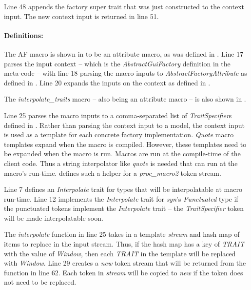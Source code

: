 Line 48 appends the factory super trait that was just constructed to the context input.
The new context input is returned in line 51.

\paragraph{Definitions:}
The AF macro is shown in  to be an attribute macro, as was defined in .
Line 17 parses the input context -- which is the \textit{AbstractGuiFactory} definition in the meta-code -- with line 18 parsing the macro inputs to \textit{AbstractFactoryAttribute} as defined in .
Line 20 expands the inputs on the context as defined in .

The \textit{interpolate\_traits} macro -- also being an attribute macro -- is also shown in .

Line 25 parses the macro inputs to a comma-separated list of \textit{TraitSpecifier}s defined in .
Rather than parsing the context input to a model, the context input is used as a template for each concrete factory implementation.
\textit{Quote} macro templates expand when the macro is compiled.
However, these templates need to be expanded when the macro is run.
Macros are run at the compile-time of the client code.
Thus a string interpolator like \textit{quote} is needed that can run at the macro's run-time.
 defines such a helper for a \textit{proc\_macro2} token stream.

Line 7 defines an \textit{Interpolate} trait for types that will be interpolatable at macro run-time.
Line 12 implements the \textit{Interpolate} trait for \textit{syn}'s \textit{Punctuated} type if the punctuated tokens implement the \textit{Interpolate} trait -- the \textit{TraitSpecifier} token will be made interpolatable soon.

The \textit{interpolate} function in line 25 takes in a template \textit{stream} and hash map of items to replace in the input stream.
Thus, if the hash map has a key of \textit{TRAIT} with the value of \textit{Window}, then each \textit{TRAIT} in the template will be replaced with \textit{Window}.
Line 29 creates a \textit{new} token stream that will be returned from the function in line 62.
Each token in \textit{stream} will be copied to \textit{new} if the token does not need to be replaced.

